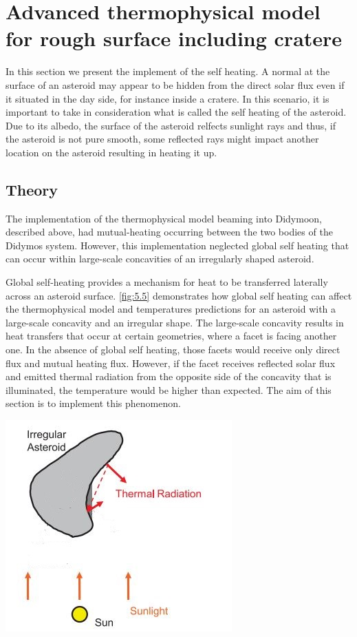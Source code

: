\section{Advanced thermophysical model for rough surface including cratere}
\label{sec:5}

In this section we present the implement of the self heating. A normal at the surface of an asteroid may appear to be hidden from the direct solar flux even if it situated in the day side, for instance inside a cratere. In this scenario, it is important to take in consideration what is called the self heating of the asteroid. Due to its albedo, the surface of the asteroid relfects sunlight rays and thus, if the asteroid is not pure smooth, some reflected rays might impact another location on the asteroid resulting in heating it up.

\subsection{Theory}

The implementation of the thermophysical model beaming into Didymoon, described above, had mutual-heating occurring between the two bodies of the Didymos system. However, this implementation neglected global self heating that can occur within large-scale concavities of an irregularly shaped asteroid.

Global self-heating provides a mechanism for heat to be transferred laterally across an asteroid surface. \autoref{fig:5.5} demonstrates how global self heating can affect the thermophysical model and temperatures predictions for an asteroid with a large-scale concavity and an irregular shape. The large-scale concavity results in heat transfers that occur at certain geometries, where a facet is facing another one. In the absence of global self heating, those facets would receive only direct flux and mutual heating flux. However, if the facet receives reflected solar flux and emitted thermal radiation from the opposite side of the concavity that is illuminated, the temperature would be higher than expected. The aim of this section is to implement this phenomenon.

\begin{center}
    \includegraphics[width=0.5\linewidth]{rsc/self.jpg}
    \label{fig:5.1}
\end{center}


